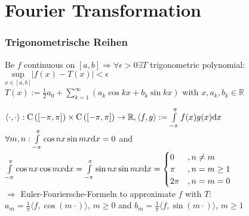 \documentclass[a4paper]{article}
\begin{document}
\section{Fourier Transformation}

\subsubsection{Trigonometrische Reihen}

\begin{tcolorbox}[colback=white,colframe=red!75!black,title=Lemma 1.1]
Be $f$ continuous on $[a,b] \Rightarrow \forall \epsilon>0 \exists T$ trigonometric polynomial: $\underset{x\in[a,b]}{\mathrm{sup}} |f(x)-T(x)| < \epsilon$\\
$T(x):=\frac{1}{2}a_0 + \sum_{k=1}^{\infty}\left( a_k \cos k x + b_k \sin k x \right)$ with $x,a_k,b_k\in\mathbb{R}$
\end{tcolorbox}

\begin{tcolorbox}[colback=white,colframe=red!75!black,title=Lemma 1.2]
$\langle\cdot,\cdot\rangle:
\mathrm{C}\left([-\pi,\pi]\right) \times \mathrm{C}\left([-\pi,\pi]\right) \rightarrow \mathbb{R}, 
\langle f,g \rangle := \int\limits_{-\pi}^{\pi} f(x) g(x) \text{d} x$\\
$\forall m,n: \int\limits_{-\pi}^{\pi} \cos n x \sin m x \text{d} x=0$ and \\
$\int\limits_{-\pi}^{\pi} \cos n x \cos m x \text{d} x = 
\int\limits_{-\pi}^{\pi} \sin n x \sin m x \text{d} x =
\begin{cases} 0 & , n\neq m \\ \pi & , n=m\geq 1 \\ 2 \pi & , n=m=0 \end{cases}$ \\
$\Rightarrow$ Euler-Fouriersche-Formeln to approximate $f$ with $T$:\\
$a_m = \frac{1}{\pi} \langle f,\cos(m\cdot) \rangle$, $m\geq 0$ and
$b_m = \frac{1}{\pi} \langle f,\sin(m\cdot) \rangle$, $m\geq 1$
\end{tcolorbox}
\end{document}
